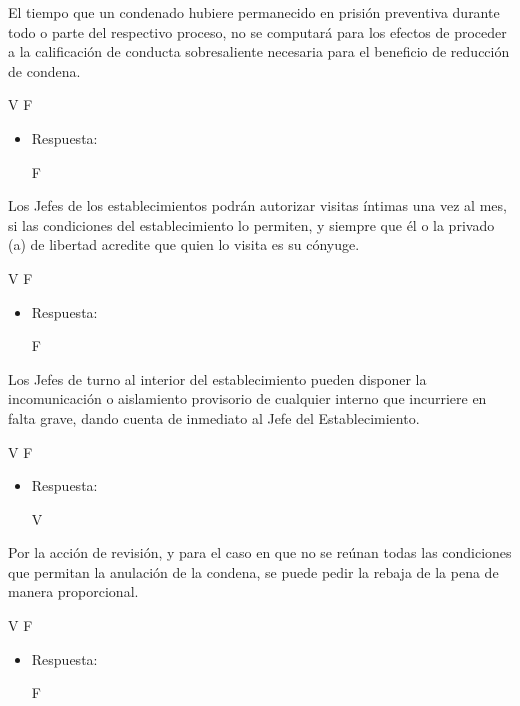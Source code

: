 \documentclass[letterpaper, 11pt]{article}
\begin{document}
El tiempo que un condenado hubiere permanecido en prisión preventiva
durante todo o parte del respectivo proceso, no se computará para los
efectos de proceder a la calificación de conducta sobresaliente
necesaria para el beneficio de reducción de condena.

V F

\begin{itemize}
\item Respuesta:

F
\end{itemize}


Los Jefes de los establecimientos podrán autorizar visitas íntimas una
vez al mes, si las condiciones del establecimiento lo permiten, y
siempre que él o la privado (a) de libertad acredite que quien lo
visita es su cónyuge.


V F

\begin{itemize}
\item Respuesta:

F
\end{itemize}


Los Jefes de turno al interior del establecimiento pueden disponer la
incomunicación o aislamiento provisorio de cualquier interno que
incurriere en falta grave, dando cuenta de inmediato al Jefe del
Establecimiento.

V F

\begin{itemize}
\item Respuesta:

V
\end{itemize}

Por la acción de revisión, y para el caso en que no se reúnan todas
las condiciones que permitan la anulación de la condena, se puede
pedir la rebaja de la pena de manera proporcional.

V F

\begin{itemize}
\item Respuesta:

F
\end{itemize}
\end{document}
